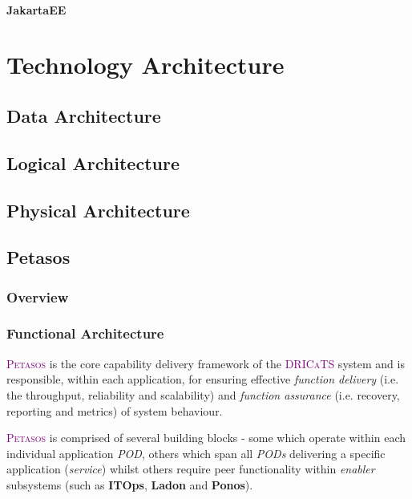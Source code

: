 \documentclass[a4paper]{book}
\newcommand{\dricats}{\textsc{\textcolor{Purple}{\small{DRICaTS }}}}
\newcommand{\petasos}{\textsc{\textcolor{Purple}{\small{Petasos }}}}
\begin{document}
\subsection{JakartaEE\texttrademark}

\part{Technology Architecture}
\chapter{Data Architecture}

\chapter{Logical Architecture}

\chapter{Physical Architecture}

\appendix

\chapter{Petasos}
\section{Overview}
\section{Functional Architecture}
    \petasos is the core capability delivery framework of the \dricats system and is responsible, within each application, for ensuring effective \textit{function delivery} (i.e. the throughput, reliability and scalability) and \textit{function assurance} (i.e. recovery, reporting and metrics) of system behaviour.

    \petasos is comprised of several building blocks - some which operate within each individual application \textit{POD}, others which span all \textit{PODs} delivering a specific application (\textit{service}) whilst others require peer functionality within \textit{enabler} subsystems (such as \textbf{ITOps}, \textbf{Ladon} and \textbf{Ponos}).  
\end{document}
